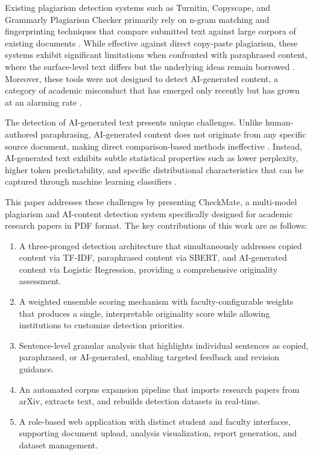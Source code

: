 \documentclass[conference]{IEEEtran}
\begin{document}
Existing plagiarism detection systems such as Turnitin, Copyscape, and Grammarly Plagiarism Checker primarily rely on n-gram matching and fingerprinting techniques that compare submitted text against large corpora of existing documents \cite{b5}. While effective against direct copy-paste plagiarism, these systems exhibit significant limitations when confronted with paraphrased content, where the surface-level text differs but the underlying ideas remain borrowed \cite{b6}. Moreover, these tools were not designed to detect AI-generated content, a category of academic misconduct that has emerged only recently but has grown at an alarming rate \cite{b7}.

The detection of AI-generated text presents unique challenges. Unlike human-authored paraphrasing, AI-generated content does not originate from any specific source document, making direct comparison-based methods ineffective \cite{b8}. Instead, AI-generated text exhibits subtle statistical properties such as lower perplexity, higher token predictability, and specific distributional characteristics that can be captured through machine learning classifiers \cite{b9}.

This paper addresses these challenges by presenting CheckMate, a multi-model plagiarism and AI-content detection system specifically designed for academic research papers in PDF format. The key contributions of this work are as follows:

\begin{enumerate}
\item A three-pronged detection architecture that simultaneously addresses copied content via TF-IDF, paraphrased content via SBERT, and AI-generated content via Logistic Regression, providing a comprehensive originality assessment.

\item A weighted ensemble scoring mechanism with faculty-configurable weights that produces a single, interpretable originality score while allowing institutions to customize detection priorities.

\item Sentence-level granular analysis that highlights individual sentences as copied, paraphrased, or AI-generated, enabling targeted feedback and revision guidance.

\item An automated corpus expansion pipeline that imports research papers from arXiv, extracts text, and rebuilds detection datasets in real-time.

\item A role-based web application with distinct student and faculty interfaces, supporting document upload, analysis visualization, report generation, and dataset management.
\end{enumerate}
\end{document}
